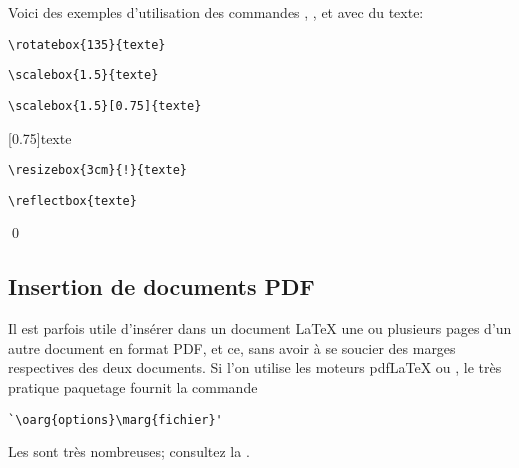 \begin{exemple}
  Voici des exemples d'utilisation des commandes \cmd{\rotatebox},
  \cmd{\scalebox}, \cmd{\resizebox} et  avec du texte:
  \begin{demo}
    \begin{texample}[0.55\linewidth]
\begin{lstlisting}
\rotatebox{135}{texte}
\end{lstlisting}
      \producing
    \end{texample}

    \begin{texample}[0.55\linewidth]
\begin{lstlisting}
\scalebox{1.5}{texte}
\end{lstlisting}
      \producing
      \scalebox{1.5}{texte}
    \end{texample}

    \begin{texample}[0.55\linewidth]
\begin{lstlisting}
\scalebox{1.5}[0.75]{texte}
\end{lstlisting}
      \producing
      \scalebox{1.5}[0.75]{texte}
    \end{texample}

    \begin{texample}[0.55\linewidth]
\begin{lstlisting}
\resizebox{3cm}{!}{texte}
\end{lstlisting}
      \producing
    \end{texample}

    \begin{texample}[0.55\linewidth]
\begin{lstlisting}
\reflectbox{texte}
\end{lstlisting}
      \producing
    \end{texample}
  \end{demo}
  \qed
\end{exemple}



\subsection{Insertion de documents PDF}
\label{sec:tableaux:figures:pdfpages}

Il est parfois utile d'insérer dans un document {\LaTeX} une ou
plusieurs pages d'un autre document en format PDF, et ce, sans avoir à
se soucier des marges respectives des deux documents. Si l'on utilise
les moteurs pdf{\LaTeX} ou {\XeLaTeX}, le très pratique paquetage
 \citep{pdfpages} fournit la commande
\begin{lstlisting}
`\oarg{options}\marg{fichier}'
\end{lstlisting}
Les  sont très nombreuses; consultez la %
.

